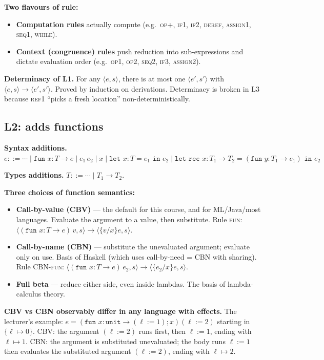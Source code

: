 \documentclass[11pt,a4paper]{article}
\newcommand{\rname}[1]{\textsc{\footnotesize#1}}
\begin{document}
\textbf{Two flavours of rule:}
\begin{itemize}[leftmargin=*,itemsep=1pt]
  \item \textbf{Computation rules} actually compute (e.g.\ \rname{op+}, \rname{if1}, \rname{if2}, \rname{deref}, \rname{assign1}, \rname{seq1}, \rname{while}).
  \item \textbf{Context (congruence) rules} push reduction into sub-expressions and dictate evaluation order (e.g.\ \rname{op1}, \rname{op2}, \rname{seq2}, \rname{if3}, \rname{assign2}).
\end{itemize}

\textbf{Determinacy of L1.} For any $\langle e, s\rangle$, there is at most one $\langle e', s'\rangle$ with $\langle e, s\rangle \to \langle e', s'\rangle$. Proved by induction on derivations. Determinacy is broken in L3 because \rname{ref1} ``picks a fresh location'' non-deterministically.

\subsection{L2: adds functions}

\textbf{Syntax additions.} $e ::= \cdots \mid \texttt{fun } x{:}T \to e \mid e_1\,e_2 \mid x \mid \texttt{let } x{:}T = e_1 \texttt{ in } e_2 \mid \texttt{let rec } x{:}T_1 \to T_2 = (\texttt{fun } y{:}T_1 \to e_1) \texttt{ in } e_2$

\textbf{Types additions.} $T ::= \cdots \mid T_1 \to T_2$.

\textbf{Three choices of function semantics:}
\begin{itemize}[leftmargin=*,itemsep=1pt]
  \item \textbf{Call-by-value (CBV)} --- the default for this course, and for ML/Java/most languages. Evaluate the argument to a value, then substitute. Rule \rname{fun}: $\langle (\texttt{fun } x{:}T \to e)\, v, s\rangle \to \langle \{v/x\}e, s\rangle$.
  \item \textbf{Call-by-name (CBN)} --- substitute the unevaluated argument; evaluate only on use. Basis of Haskell (which uses call-by-need = CBN with sharing). Rule \rname{CBN-fun}: $\langle (\texttt{fun } x{:}T \to e)\, e_2, s\rangle \to \langle \{e_2/x\}e, s\rangle$.
  \item \textbf{Full beta} --- reduce either side, even inside lambdas. The basis of lambda-calculus theory.
\end{itemize}

\begin{gotcha}
\textbf{CBV vs CBN observably differ in any language with effects.} The lecturer's example: $e = (\texttt{fun } x{:}\texttt{unit} \to (\ell := 1); x)(\ell := 2)$ starting in $\{\ell \mapsto 0\}$. CBV: the argument $(\ell := 2)$ runs first, then $\ell := 1$, ending with $\ell \mapsto 1$. CBN: the argument is substituted unevaluated; the body runs $\ell := 1$ then evaluates the substituted argument $(\ell := 2)$, ending with $\ell \mapsto 2$.
\end{gotcha}
\end{document}
